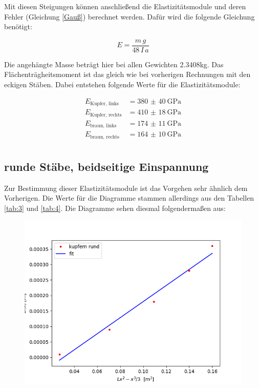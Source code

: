 \noindent Mit diesen Steigungen können anschließend die Elastizitätsmodule und deren Fehler (Gleichung \ref{Gauß}) berechnet werden. Dafür wird die folgende Gleichung benötigt:

\begin{displaymath}
    E = \frac{m\, g}{48\, I\, a}
\end{displaymath}

\noindent Die angehängte Masse beträgt hier bei allen Gewichten 2.3408kg. Das Flächenträgheitsmoment ist das gleich wie bei vorherigen Rechnungen mit den eckigen Stäben. Dabei entstehen folgende Werte für die Elastizitätsmodule:

\begin{align*}
    E_\text{Kupfer, links} &= \SI[separate-uncertainty=true]{380(40)}{\giga\pascal} \\
    E_\text{Kupfer, rechts} &= \SI[separate-uncertainty=true]{410(18)}{\giga\pascal}\\
    E_\text{braun, links} &=  \SI[separate-uncertainty=true]{174(11)}{\giga\pascal}  \\
    E_\text{braun, rechts} &= \SI[separate-uncertainty=true]{164(10)}{\giga\pascal} \\
\end{align*}

\subsection{runde Stäbe, beidseitige Einspannung}

Zur Bestimmung dieser Elastizitätsmodule ist das Vorgehen sehr ähnlich dem Vorherigen. Die Werte für die Diagramme stammen allerdings aus den Tabellen \ref{tab:3} und \ref{tab:4}. Die Diagramme sehen diesmal folgendermaßen aus:

\begin{figure}[H]
    \centering
    \includegraphics{krb.png}
\end{figure}

